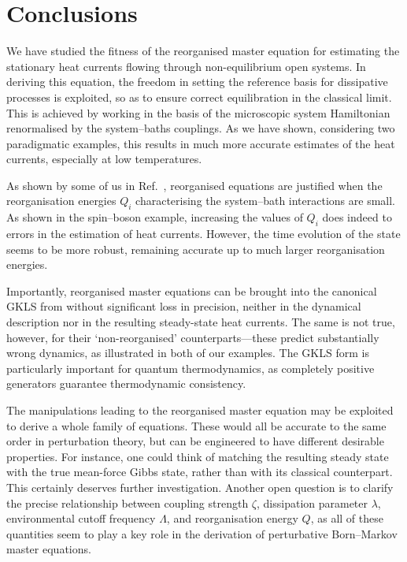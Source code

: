 \documentclass[aps,pra,superscriptaddress,twocolumn,nofootinbib]{revtex4-2}
\begin{document}
\section{Conclusions}\label{sec:conclusions}

We have studied the fitness of the reorganised master equation for estimating the stationary heat currents flowing through non-equilibrium open systems. In deriving this equation, the freedom in setting the reference basis for dissipative processes is exploited, so as to ensure correct equilibration in the classical limit. This is achieved by working in the basis of the microscopic system Hamiltonian renormalised by the system--baths couplings. As we have shown, considering two paradigmatic examples, this results in much more accurate estimates of the heat currents, especially at low temperatures. 

As shown by some of us in Ref.~\cite{correa2023}, reorganised equations are justified when the reorganisation energies $ Q_i $ characterising the system--bath interactions are small. As shown in the spin--boson example, increasing the values of $ Q_i $ does indeed to errors in the estimation of heat currents. However, the time evolution of the state seems to be more robust, remaining accurate up to much larger reorganisation energies.

Importantly, reorganised master equations can be brought into the canonical GKLS from without significant loss in precision, neither in the dynamical description nor in the resulting steady-state heat currents. The same is not true, however, for their `non-reorganised' counterparts---these predict substantially wrong dynamics, as illustrated in both of our examples. The GKLS form is particularly important for quantum thermodynamics, as completely positive generators guarantee thermodynamic consistency.

The manipulations leading to the reorganised master equation may be exploited to derive a whole family of equations. These would all be accurate to the same order in perturbation theory, but can be engineered to have different desirable properties. For instance, one could think of matching the resulting steady state with the true mean-force Gibbs state, rather than with its classical counterpart. This certainly deserves further investigation. Another open question is to clarify the precise relationship between coupling strength $\zeta$, dissipation parameter $ \lambda $, environmental cutoff frequency $ \Lambda $, and reorganisation energy $ Q $, as all of these quantities seem to play a key role in the derivation of perturbative Born--Markov master equations.
\end{document}
